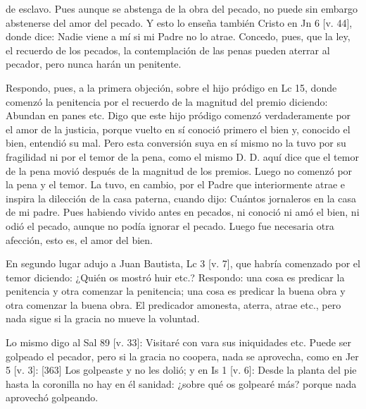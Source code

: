 de esclavo. Pues aunque se abstenga de la obra del pecado, no puede sin embargo abstenerse del amor del pecado. Y esto lo enseña también Cristo en Jn 6 [v. 44], donde dice: Nadie viene a mí si mi Padre no lo atrae. Concedo, pues, que la ley, el recuerdo de los pecados, la contemplación de las penas pueden aterrar al pecador, pero nunca harán un penitente.

Respondo, pues, a la primera objeción, sobre el hijo pródigo en Lc 15, donde comenzó la penitencia por el recuerdo de la magnitud del premio diciendo: Abundan en panes etc. Digo que este hijo pródigo comenzó verdaderamente por el amor de la justicia, porque vuelto en sí conoció primero el bien y, conocido el bien, entendió su mal. Pero esta conversión suya en sí mismo no la tuvo por su fragilidad ni por el temor de la pena, como el mismo D. D. aquí dice que el temor de la pena movió después de la magnitud de los premios. Luego no comenzó por la pena y el temor. La tuvo, en cambio, por el Padre que interiormente atrae e inspira la dilección de la casa paterna, cuando dijo: Cuántos jornaleros en la casa de mi padre. Pues habiendo vivido antes en pecados, ni conoció ni amó el bien, ni odió el pecado, aunque no podía ignorar el pecado. Luego fue necesaria otra afección, esto es, el amor del bien.

En segundo lugar adujo a Juan Bautista, Lc 3 [v. 7], que habría comenzado por el temor diciendo: ¿Quién os mostró huir etc.? Respondo: una cosa es predicar la penitencia y otra comenzar la penitencia; una cosa es predicar la buena obra y otra comenzar la buena obra. El predicador amonesta, aterra, atrae etc., pero nada sigue si la gracia no mueve la voluntad.

Lo mismo digo al Sal 89 [v. 33]: Visitaré con vara sus iniquidades etc. Puede ser golpeado el pecador, pero si la gracia no coopera, nada se aprovecha, como en Jer 5 [v. 3]: [363] Los golpeaste y no les dolió; y en Is 1 [v. 6]: Desde la planta del pie hasta la coronilla no hay en él sanidad: ¿sobre qué os golpearé más? porque nada aprovechó golpeando.

